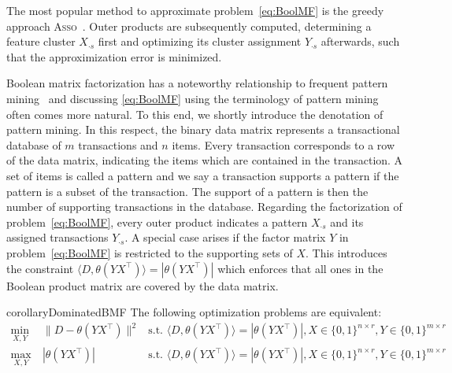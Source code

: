 The most popular method to approximate problem~\eqref{eq:BoolMF} is the greedy approach \textsc{Asso}~\citep{miettinen2008discrete}. Outer products are subsequently computed, determining a feature cluster $X_{\cdot s}$ first and optimizing its cluster assignment $Y_{\cdot s}$ afterwards, such that the approximization error is minimized. 

Boolean matrix factorization has a noteworthy relationship to frequent pattern mining~\citep{aggarwal2014frequent} and discussing \ref{eq:BoolMF} using the terminology of pattern mining often comes more natural. To this end, we shortly introduce the denotation of pattern mining. In this respect, the binary data matrix represents a transactional database of $m$ transactions and $n$ items. Every transaction corresponds to a row of the data matrix, indicating the items which are contained in the transaction. A set of items is called a pattern and we say a transaction supports a pattern if the pattern is a subset of the transaction. The support of a pattern is then the number of supporting transactions in the database. Regarding the factorization of problem~\eqref{eq:BoolMF}, every outer product indicates a pattern $X_{\cdot s}$ and its assigned transactions $Y_{\cdot s}$. 
A special case arises if the factor matrix $Y$ in problem~\eqref{eq:BoolMF} is restricted to the supporting sets of $X$.  This introduces the constraint $\langle D,\theta(YX^\top)\rangle=|\theta(YX^\top)|$ which enforces that all ones in the Boolean product matrix are covered by the data matrix. 
\begin{restatable}{corollary}{DominatedBMF}\label{thm:dominatedBMF}
The following optimization problems are equivalent:
\begin{align}
    \label{eq:BoolMF_pattern}
    \min_{X,Y}&\ \|D-\theta(YX^\top)\|^2 & \text{s.t. } \langle D,\theta(YX^\top)\rangle = |\theta(YX^\top)|,X\in\{0,1\}^{n\times r}, Y\in\{0,1\}^{m\times r}\\
    \label{eq:BoolMF_patternTr}
    \max_{X,Y}&\ |\theta(YX^\top)|& \text{s.t. } \langle D,\theta(YX^\top)\rangle = |\theta(YX^\top)|,X\in\{0,1\}^{n\times r}, Y\in\{0,1\}^{m\times r}
\end{align}
\end{restatable}
